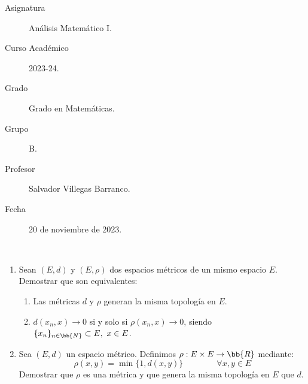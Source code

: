 \documentclass[12pt]{article}
\begin{document}

    
    

    \begin{description}
        \item[Asignatura] Análisis Matemático I.
        \item[Curso Académico] 2023-24.
        \item[Grado] Grado en Matemáticas.
        \item[Grupo] B.
        \item[Profesor] Salvador Villegas Barranco.
        \item[Fecha] 20 de noviembre de 2023.
    
    \end{description}
    \newpage
    
    \begin{ejercicio}[4 puntos]~
        \begin{enumerate}
            \item Sean $(E,d)$ y $(E,\rho)$ dos espacios métricos de un mismo espacio $E$. Demostrar que son equivalentes:
            \begin{enumerate}
                \item Las métricas $d$ y $\rho$ generan la misma topología en $E$.
                \item $d(x_n,x)\to 0$ si y solo si $\rho(x_n,x)\to 0$, siendo $\{x_n\}_{n\in \bb{N}}\subset E,~x\in E$.
            \end{enumerate}

            \item Sea $(E,d)$ un espacio métrico. Definimos $\rho:E\times E\to \bb{R}$ mediante:
            \begin{equation*}
                \rho(x,y) = \min \{1,d(x,y)\} \qquad \qquad \forall x,y\in E
            \end{equation*}
            Demostrar que $\rho$ es una métrica y que genera la misma topología en $E$ que $d$.
        \end{enumerate}
    \end{ejercicio}
\end{document}
